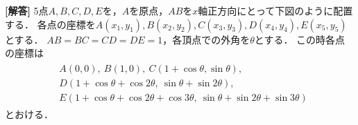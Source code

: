 \documentclass[../../main.tex]{subfiles}
\begin{document}
\begin{oframed}
  
\end{oframed}

{\bf [解答]}
5点$A,B,C,D,E$を，$A$を原点，$AB$を$x$軸正方向にとって下図のように配置する．
各点の座標を$A(x_1,y_1), B(x_2,y_2), C(x_3,y_3), D(x_4,y_4), E(x_5,y_5)$とする．
$AB=BC=CD=DE=1$，各頂点での外角を$\theta$とする．
この時各点の座標は
\begin{align}
  \begin{split}
    & A(0,0),\ B(1,0),\ C(1+\cos\theta,\sin\theta), \\
    & D(1+\cos\theta+\cos2\theta,\ \sin\theta+\sin2\theta), \\
    & E(1+\cos\theta+\cos2\theta+\cos3\theta,\ \sin\theta+\sin2\theta+\sin3\theta)
  \end{split} \label{eq:1}
\end{align}
とおける．
\end{document}
